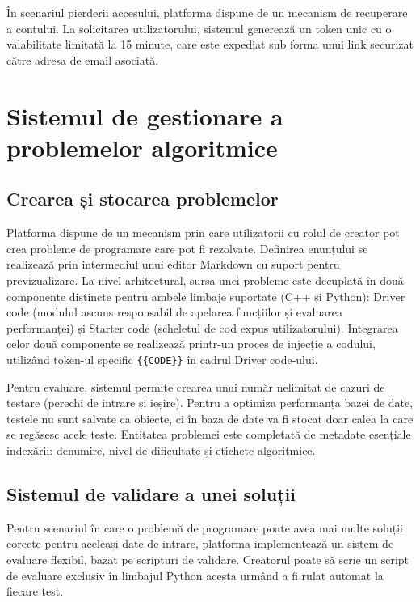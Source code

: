 În scenariul pierderii accesului, platforma dispune de un mecanism de recuperare a contului. La solicitarea utilizatorului, sistemul generează un token unic cu o valabilitate limitată la 15 minute, care este expediat sub forma unui link securizat către adresa de email asociată.

\section{Sistemul de gestionare a problemelor algoritmice}

\subsection{Crearea și stocarea problemelor}

Platforma dispune de un mecanism prin care utilizatorii cu rolul de creator pot crea probleme de programare care pot fi rezolvate. Definirea enunțului se realizează prin intermediul unui editor Markdown cu suport pentru previzualizare. La nivel arhitectural, sursa unei probleme este decuplată în două componente distincte pentru ambele limbaje suportate (C++ și Python): Driver code (modulul ascuns responsabil de apelarea funcțiilor și evaluarea performanței) și Starter code (scheletul de cod expus utilizatorului). Integrarea celor două componente se realizează printr-un proces de injecție a codului, utilizând token-ul specific \verb|{{CODE}}| în cadrul Driver code-ului. 

Pentru evaluare, sistemul permite crearea unui număr nelimitat de cazuri de testare (perechi de intrare și ieșire). Pentru a optimiza performanța bazei de date, testele nu sunt salvate ca obiecte, ci în baza de date va fi stocat doar calea la care se regăsesc acele teste. Entitatea problemei este completată de metadate esențiale indexării: denumire, nivel de dificultate și etichete algoritmice.

\subsection{Sistemul de validare a unei soluții}

Pentru scenariul în care o problemă de programare poate avea mai multe soluții corecte pentru aceleași date de intrare, platforma implementează un sistem de evaluare flexibil, bazat pe scripturi de validare. Creatorul poate să scrie un script de evaluare exclusiv în limbajul Python acesta urmând a fi rulat automat la fiecare test.  


